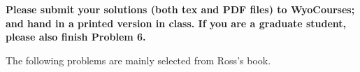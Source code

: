 \documentclass{report}
\begin{document}

\fancyhead{}
\fancyfoot{}


\newcommand{\N}{\mathbb{N}}
\newcommand{\Z}{\mathbb{Z}}
\newcommand{\Q}{\mathbb{Q}}
\newcommand{\R}{\mathbb{R}}
\newcommand{\C}{\mathbb{C}}
\newcommand{\D}{\mathbb{D}}
\newcommand{\<}{\left\langle}
\renewcommand{\>}{\right\rangle}
\renewcommand{\Re}[1]{\text{Re}\ #1}
\renewcommand{\Im}[1]{\text{Im}\ #1}
\renewcommand{\mod}[1]{(\operatorname{mod}#1)}


\noindent
{\bf Please submit your solutions (both tex and PDF files) to WyoCourses; and hand in a printed version in class. If you are a graduate student, please also finish Problem 6.}

\medskip


The following problems are mainly selected from Ross's book. 
\end{document}
